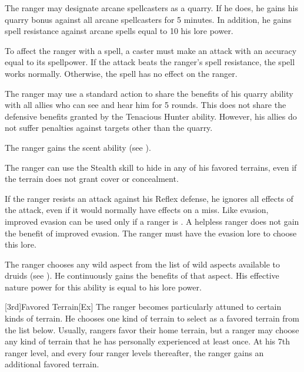 The ranger may designate arcane spellcasters as a quarry.
If he does, he gains his quarry bonus against all arcane spellcasters for 5 minutes.
In addition, he gains spell resistance against arcane spells equal to 10 \add his lore power.

To affect the ranger with a spell, a caster must make an attack with an accuracy equal to its spellpower.
If the attack beats the ranger's spell resistance, the spell works normally.
Otherwise, the spell has no effect on the ranger.

The ranger may use a standard action to share the benefits of his quarry ability with all allies who can see and hear him for 5 rounds.
This does not share the defensive benefits granted by the Tenacious Hunter ability.
However, his allies do not suffer penalties against targets other than the quarry.

The ranger gains the scent ability (see ).

\label{Camouflage}
The ranger can use the Stealth skill to hide in any of his favored terrains, even if the terrain does not grant cover or concealment.

If the ranger resists an attack against his Reflex defense, he ignores all effects of the attack, even if it would normally have effects on a miss.
Like evasion, improved evasion can be used only if a ranger is \unencumbered.
A helpless ranger does not gain the benefit of improved evasion.
The ranger must have the evasion lore to choose this lore.

The ranger chooses any wild aspect from the list of wild aspects available to druids (see ).
He continuously gains the benefits of that aspect.
His effective nature power for this ability is equal to his lore power.

[3rd]{Favored Terrain}[Ex]
The ranger becomes particularly attuned to certain kinds of terrain.
He chooses one kind of terrain to select as a favored terrain from the list below.
Usually, rangers favor their home terrain, but a ranger may choose any kind of terrain that he has personally experienced at least once.
At his 7th ranger level, and every four ranger levels thereafter, the ranger gains an additional favored terrain.

